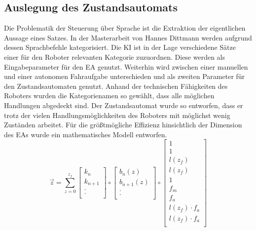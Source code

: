 		\subsection{Auslegung des Zustandsautomats}
		Die Problematik der Steuerung über Sprache ist die Extraktion der eigentlichen Aussage eines Satzes. In der Masterarbeit von Hannes Dittmann werden aufgrund dessen Sprachbefehle kategorisiert. Die KI ist in der Lage verschiedene Sätze einer für den Roboter relevanten Kategorie zuzuordnen. Diese werden als Eingabeparameter für den EA genutzt. Weiterhin wird zwischen einer manuellen und einer autonomen Fahraufgabe unterschieden und als zweiten Parameter für den Zustandsautomaten genutzt. Anhand der technischen Fähigkeiten des Roboters wurden die Kategorienamen so gewählt, dass alle möglichen Handlungen abgedeckt sind. Der Zustandsautomat wurde so entworfen, dass er trotz der vielen Handlungsmöglichkeiten des Roboters mit möglichst wenig Zuständen arbeitet. Für die größtmögliche Effizienz hinsichtlich der Dimension des EAs wurde ein mathematisches Modell entworfen.\\
		
		\begin{equation}
			\vec{z}=\sum_{z=0}^{z_f} \left[ \begin{array}{r}
				k_n  \\
				k_{n+1}  \\
				.  \\
				.  \\
			\end{array}\right] \circ
			\left[ \begin{array}{r}
				b_n(z)  \\
				b_{n+1}(z)  \\
				.  \\
				.  \\
			\end{array}\right]  \circ
			\left[ \begin{array}{r}
				1  \\
				1  \\
				l(z_f)  \\
				l(z_f)  \\
				1  \\
				f_m  \\
				f_a  \\
				l(z_f)\cdot f_a  \\
				l(z_f)\cdot f_a \\
			\end{array}\right] 
			\label{eq: statemachine}
		\end{equation}\\
	
